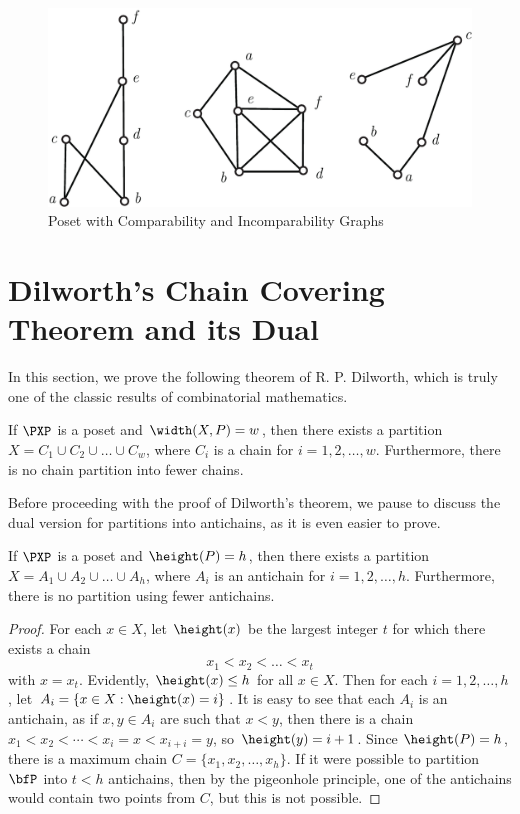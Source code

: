 \begin{figure}
\begin{center}
\includegraphics*[scale=.4]{posets-figs/wttfig-6}
\caption{Poset with Comparability and Incomparability Graphs}
\label{fig:diagram}
\end{center}
\end{figure}

\section{Dilworth's Chain Covering Theorem and its Dual}\label{s:posets:dilworth}

In this section, we prove the following theorem of R. P. Dilworth,
which is truly one of the classic results of combinatorial mathematics.

\begin{theorem}\label{thm:dilworth}
If $\PXP$ is a poset and $\width(X,P)=w$, then there exists a 
partition $X=C_1\cup C_2\cup\dots \cup C_w$, where $C_i$ is a 
chain for $i=1,2,\dots,w$. Furthermore, there is no chain partition
into fewer chains.
\end{theorem}

Before proceeding with the proof of Dilworth's theorem, we pause to
discuss the dual version for partitions into antichains, as it is
even easier to prove.

\begin{theorem}\label{thm:dualdilworth}
If $\PXP$ is a poset and $\height(P)=h$,
then there exists a partition $X=A_1\cup A_2\cup\dots\cup A_h$, where
$A_i$ is an antichain for $i=1,2,\dots,h$. Furthermore, there is no
partition using fewer antichains.
\end{theorem}

\begin{proof}
For each $x\in X$, let $\height(x)$ be the largest integer $t$ for
which there exists a chain \[x_1<x_2<\dots < x_t\] with $x=x_t$.
Evidently, $\height(x)\le h$ for all $x\in X$.  Then for each
$i=1,2,\dots,h$, let $A_i=\{x\in X:\height(x)=i\}$.  It is easy to
see that each $A_i$ is an antichain, as if $x,y\in A_i$ are such
that $x<y$, then there is a chain $x_1<x_2<\cdots<x_i=x <
x_{i+i}=y$, so $\height(y)=i+1$. Since $\height(P)=h$, there is a
maximum chain $C=\{x_1,x_2,\dots,x_h\}$. If it were possible to
partition $\bfP$ into $t<h$ antichains, then by the pigeonhole
principle, one of the antichains would contain two points from $C$,
but this is not possible.
\end{proof}

